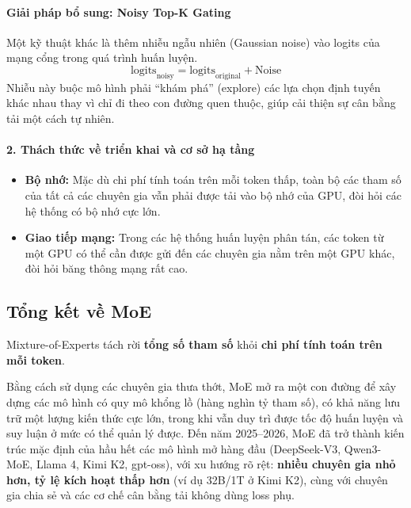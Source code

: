 \begin{center}
\label{fig:deepseek_v3_architecture}
\end{center}

\paragraph{Giải pháp bổ sung: Noisy Top-K Gating}
Một kỹ thuật khác là thêm nhiễu ngẫu nhiên (Gaussian noise) vào logits của mạng cổng trong quá trình huấn luyện.
$$ \text{logits}_{\text{noisy}} = \text{logits}_{\text{original}} + \text{Noise} $$
Nhiễu này buộc mô hình phải “khám phá” (explore) các lựa chọn định tuyến khác nhau thay vì chỉ đi theo con đường quen thuộc, giúp cải thiện sự cân bằng tải một cách tự nhiên.

\paragraph{2. Thách thức về triển khai và cơ sở hạ tầng}
\begin{itemize}
    \item \textbf{Bộ nhớ:} Mặc dù chi phí tính toán trên mỗi token thấp, toàn bộ các tham số của tất cả các chuyên gia vẫn phải được tải vào bộ nhớ của GPU, đòi hỏi các hệ thống có bộ nhớ cực lớn.
    \item \textbf{Giao tiếp mạng:} Trong các hệ thống huấn luyện phân tán, các token từ một GPU có thể cần được gửi đến các chuyên gia nằm trên một GPU khác, đòi hỏi băng thông mạng rất cao.
\end{itemize}

\subsection{Tổng kết về MoE}
Mixture-of-Experts tách rời \textbf{tổng số tham số} khỏi \textbf{chi phí tính toán trên mỗi token}.

Bằng cách sử dụng các chuyên gia thưa thớt, MoE mở ra một con đường để xây dựng các mô hình có quy mô khổng lồ (hàng nghìn tỷ tham số), có khả năng lưu trữ một lượng kiến thức cực lớn, trong khi vẫn duy trì được tốc độ huấn luyện và suy luận ở mức có thể quản lý được. Đến năm 2025--2026, MoE đã trở thành kiến trúc mặc định của hầu hết các mô hình mở hàng đầu (DeepSeek-V3, Qwen3-MoE, Llama 4, Kimi K2, gpt-oss), với xu hướng rõ rệt: \textbf{nhiều chuyên gia nhỏ hơn, tỷ lệ kích hoạt thấp hơn} (ví dụ 32B/1T ở Kimi K2), cùng với chuyên gia chia sẻ và các cơ chế cân bằng tải không dùng loss phụ.

